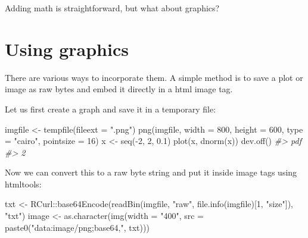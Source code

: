 \documentclass[twoside]{tufte-book}
\newenvironment{Shaded}{}{}
\newcommand{\AttributeTok}[1]{\textcolor[rgb]{0.49,0.56,0.16}{#1}}
\newcommand{\CommentTok}[1]{\textcolor[rgb]{0.38,0.63,0.69}{\textit{#1}}}
\newcommand{\DecValTok}[1]{\textcolor[rgb]{0.25,0.63,0.44}{#1}}
\newcommand{\FloatTok}[1]{\textcolor[rgb]{0.25,0.63,0.44}{#1}}
\newcommand{\FunctionTok}[1]{\textcolor[rgb]{0.02,0.16,0.49}{#1}}
\newcommand{\NormalTok}[1]{#1}
\newcommand{\OtherTok}[1]{\textcolor[rgb]{0.00,0.44,0.13}{#1}}
\newcommand{\SpecialCharTok}[1]{\textcolor[rgb]{0.25,0.44,0.63}{#1}}
\newcommand{\StringTok}[1]{\textcolor[rgb]{0.25,0.44,0.63}{#1}}
\begin{document}
Adding math is straightforward, but what about graphics?

\section{Using graphics}\label{using-graphics}

There are various ways to incorporate them. A simple method is to save a plot or image as raw bytes and embed it directly in a html image tag.

Let us first create a graph and save it in a temporary file:

\begin{Shaded}
\begin{Highlighting}[]
\NormalTok{imgfile }\OtherTok{\textless{}{-}} \FunctionTok{tempfile}\NormalTok{(}\AttributeTok{fileext =} \StringTok{".png"}\NormalTok{)}
\FunctionTok{png}\NormalTok{(imgfile, }\AttributeTok{width =} \DecValTok{800}\NormalTok{, }\AttributeTok{height =} \DecValTok{600}\NormalTok{, }\AttributeTok{type =} \StringTok{"cairo"}\NormalTok{, }\AttributeTok{pointsize =} \DecValTok{16}\NormalTok{)}
\NormalTok{x }\OtherTok{\textless{}{-}} \FunctionTok{seq}\NormalTok{(}\SpecialCharTok{{-}}\DecValTok{2}\NormalTok{, }\DecValTok{2}\NormalTok{, }\FloatTok{0.1}\NormalTok{)}
\FunctionTok{plot}\NormalTok{(x, }\FunctionTok{dnorm}\NormalTok{(x))}
\FunctionTok{dev.off}\NormalTok{()}
\CommentTok{\#\textgreater{} pdf }
\CommentTok{\#\textgreater{}   2}
\end{Highlighting}
\end{Shaded}

Now we can convert this to a raw byte string and put it inside image tags using htmltools:

\begin{Shaded}
\begin{Highlighting}[]
\NormalTok{txt }\OtherTok{\textless{}{-}}\NormalTok{ RCurl}\SpecialCharTok{::}\FunctionTok{base64Encode}\NormalTok{(}\FunctionTok{readBin}\NormalTok{(imgfile, }\StringTok{"raw"}\NormalTok{,}
                                   \FunctionTok{file.info}\NormalTok{(imgfile)[}\DecValTok{1}\NormalTok{, }\StringTok{"size"}\NormalTok{]),}
                           \StringTok{"txt"}\NormalTok{)}
\NormalTok{image }\OtherTok{\textless{}{-}} \FunctionTok{as.character}\NormalTok{(}\FunctionTok{img}\NormalTok{(}\AttributeTok{width =} \StringTok{"400"}\NormalTok{, }
                          \AttributeTok{src =} \FunctionTok{paste0}\NormalTok{(}\StringTok{"data:image/png;base64,"}\NormalTok{, txt)))}
\end{Highlighting}
\end{Shaded}
\end{document}
